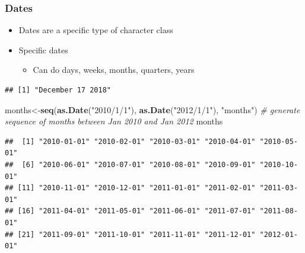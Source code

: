 \documentclass[]{book}
\newenvironment{Shaded}{\begin{snugshade}}{\end{snugshade}}
\newcommand{\KeywordTok}[1]{\textcolor[rgb]{0.13,0.29,0.53}{\textbf{#1}}}
\newcommand{\DataTypeTok}[1]{\textcolor[rgb]{0.13,0.29,0.53}{#1}}
\newcommand{\StringTok}[1]{\textcolor[rgb]{0.31,0.60,0.02}{#1}}
\newcommand{\CommentTok}[1]{\textcolor[rgb]{0.56,0.35,0.01}{\textit{#1}}}
\newcommand{\NormalTok}[1]{#1}
\providecommand{\tightlist}{%
  \setlength{\itemsep}{0pt}\setlength{\parskip}{0pt}}
\theoremstyle{definition}
\theoremstyle{definition}
\theoremstyle{definition}
\theoremstyle{remark}
\begin{document}
\subsubsection{Dates}\label{dates}

\begin{itemize}
\tightlist
\item
  Dates are a specific type of character class
\item
  Specific dates

  \begin{itemize}
  \tightlist
  \item
    Can do days, weeks, months, quarters, years
  \end{itemize}
\end{itemize}

\begin{Shaded}
\end{Shaded}

\begin{verbatim}
## [1] "December 17 2018"
\end{verbatim}

\begin{Shaded}
\begin{Highlighting}[]
\NormalTok{months<-}\KeywordTok{seq}\NormalTok{(}\KeywordTok{as.Date}\NormalTok{(}\StringTok{"2010/1/1"}\NormalTok{), }\KeywordTok{as.Date}\NormalTok{(}\StringTok{"2012/1/1"}\NormalTok{), }\StringTok{"months"}\NormalTok{) }\CommentTok{# generate sequence of months between Jan 2010 and Jan 2012}
\NormalTok{months}
\end{Highlighting}
\end{Shaded}

\begin{verbatim}
##  [1] "2010-01-01" "2010-02-01" "2010-03-01" "2010-04-01" "2010-05-01"
##  [6] "2010-06-01" "2010-07-01" "2010-08-01" "2010-09-01" "2010-10-01"
## [11] "2010-11-01" "2010-12-01" "2011-01-01" "2011-02-01" "2011-03-01"
## [16] "2011-04-01" "2011-05-01" "2011-06-01" "2011-07-01" "2011-08-01"
## [21] "2011-09-01" "2011-10-01" "2011-11-01" "2011-12-01" "2012-01-01"
\end{verbatim}
\end{document}
